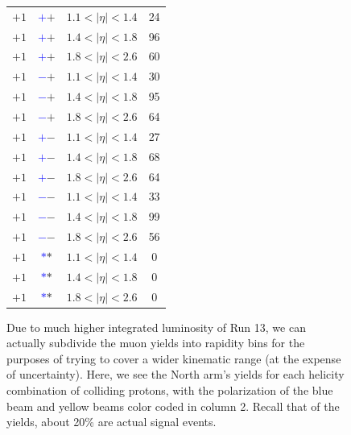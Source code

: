 \begin{figure}
\begin{minipage}[c]{0.67\textwidth}
\begin{tabular}{cccc}
      $+1$ &\textbf{\textcolor{blue}{$+$}\textcolor{ucrgold}{$+$}} & $1.1 < \vert\eta\vert < 1.4$ & 24 \\
      $+1$ &\textbf{\textcolor{blue}{$+$}\textcolor{ucrgold}{$+$}} & $1.4 < \vert\eta\vert < 1.8$ & 96 \\
      $+1$ &\textbf{\textcolor{blue}{$+$}\textcolor{ucrgold}{$+$}} & $1.8 < \vert\eta\vert < 2.6$ & 60 \\
      $+1$ &\textbf{\textcolor{blue}{$-$}\textcolor{ucrgold}{$+$}} & $1.1 < \vert\eta\vert < 1.4$ & 30 \\
      $+1$ &\textbf{\textcolor{blue}{$-$}\textcolor{ucrgold}{$+$}} & $1.4 < \vert\eta\vert < 1.8$ & 95 \\
      $+1$ &\textbf{\textcolor{blue}{$-$}\textcolor{ucrgold}{$+$}} & $1.8 < \vert\eta\vert < 2.6$ & 64 \\
      $+1$ &\textbf{\textcolor{blue}{$+$}\textcolor{ucrgold}{$-$}} & $1.1 < \vert\eta\vert < 1.4$ & 27 \\
      $+1$ &\textbf{\textcolor{blue}{$+$}\textcolor{ucrgold}{$-$}} & $1.4 < \vert\eta\vert < 1.8$ & 68 \\
      $+1$ &\textbf{\textcolor{blue}{$+$}\textcolor{ucrgold}{$-$}} & $1.8 < \vert\eta\vert < 2.6$ & 64 \\
      $+1$ &\textbf{\textcolor{blue}{$-$}\textcolor{ucrgold}{$-$}} & $1.1 < \vert\eta\vert < 1.4$ & 33 \\
      $+1$ &\textbf{\textcolor{blue}{$-$}\textcolor{ucrgold}{$-$}} & $1.4 < \vert\eta\vert < 1.8$ & 99 \\
      $+1$ &\textbf{\textcolor{blue}{$-$}\textcolor{ucrgold}{$-$}} & $1.8 < \vert\eta\vert < 2.6$ & 56 \\
      $+1$ &\textbf{\textcolor{blue}{$*$}\textcolor{ucrgold}{$*$}} & $1.1 < \vert\eta\vert < 1.4$ & 0 \\
      $+1$ &\textbf{\textcolor{blue}{$*$}\textcolor{ucrgold}{$*$}} & $1.4 < \vert\eta\vert < 1.8$ & 0 \\
      $+1$ &\textbf{\textcolor{blue}{$*$}\textcolor{ucrgold}{$*$}} & $1.8 < \vert\eta\vert < 2.6$ & 0 \\
      \bottomrule
    \end{tabular}
  \end{minipage}\hfill
  \begin{minipage}[c]{0.3\textwidth}
    \caption{
      Due to much higher integrated luminosity of Run 13, we can actually
      subdivide the muon yields into rapidity bins for the purposes of trying to
      cover a wider kinematic range (at the expense of uncertainty). Here, we see
      the North arm's yields for each helicity combination of colliding protons,
      with the polarization of the blue beam and yellow beams color coded in
      column 2. Recall that of the yields, about 20\% are actual signal events.
    }
    \label{tab:north_sorted_muons_eta_bins}
  \end{minipage}
\end{figure}

